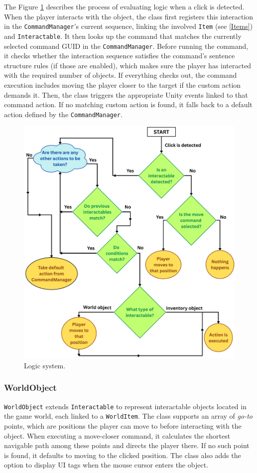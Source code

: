 The Figure \ref{fig:Interactable} describes the process of evaluating logic when a click is detected. When the player interacts with the object, the class first registers this interaction in the \verb|CommandManager|’s current sequence, linking the involved \verb|Item| (see \ref{Items}) and \verb|Interactable|. It then looks up the command that matches the currently selected command GUID in the \verb|CommandManager|. Before running the command, it checks whether the interaction sequence satisfies the command’s sentence structure rules (if those are enabled), which makes sure the player has interacted with the required number of objects. If everything checks out, the command execution includes moving the player closer to the target if the custom action demands it. Then, the class triggers the appropriate Unity events linked to that command action. If no matching custom action is found, it falls back to a default action defined by the \verb|CommandManager|.

\begin{figure}[H]
\centering
\includegraphics[width=0.9\linewidth]{img/Commands3.png}
\caption{Logic system.}
\label{fig:Interactable}
\end{figure}

\subsubsection{WorldObject}
\verb|WorldObject| extends \verb|Interactable| to represent interactable objects located in the game world, each linked to a \verb|WorldItem|. The class supports an array of \textit{go-to} points, which are positions the player can move to before interacting with the object. When executing a move-closer command, it calculates the shortest navigable path among these points and directs the player there. If no such point is found, it defaults to moving to the clicked position. The class also adds the option to display UI tags when the mouse cursor enters the object.

